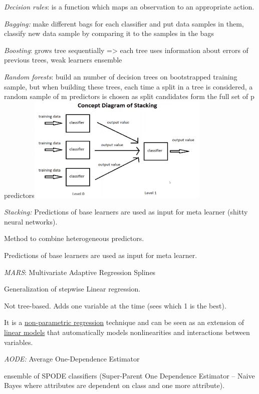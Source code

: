 \textit{Decision rules}: is a function which maps an observation to
an appropriate action.

\textit{Bagging:} make different bags for each classifier and put
data samples in them, classify new data sample by comparing it to the
samples in the bags

\textit{Boosting}: grows tree sequentially =\textgreater{} each tree
uses information about errors of previous trees, weak learners ensemble

\textit{Random forests}: build an number of decision trees on
bootstrapped training sample, but when building these trees, each time a
split in a tree is considered, a random sample of m predictors is chosen
as split candidates form the full set of p
predictors\includegraphics[width=3.42406in,height=2.00895in]{media/image35.png}

\textit{Stacking:} Predictions of base learners are used as input for
meta learner (shitty neural networks).

Method to combine heterogeneous predictors.

Predictions of base learners are used as input for meta learner.

\textit{MARS}: Multivariate Adaptive Regression Splines

Generalization of stepwise Linear regression.

Not tree-based. Adds one variable at the time (sees which 1 is the
best).

It is a
\href{https://en.wikipedia.org/wiki/Non-parametric_regression}{non-parametric
regression} technique and can be seen as an extension of
\href{https://en.wikipedia.org/wiki/Linear_model}{linear models} that
automatically models nonlinearities and interactions between variables.

\textit{AODE:} Average One-Dependence Estimator

ensemble of SPODE classifiers (Super-Parent One Dependence Estimator --
Naive Bayes where attributes are dependent on class and one more
attribute).

